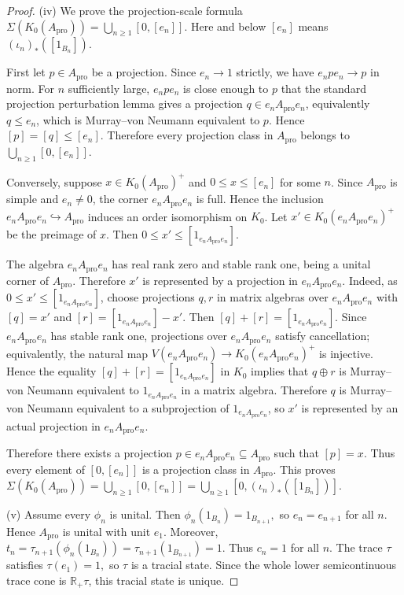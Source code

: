 \documentclass[10pt,a4paper]{amsart}
\newcommand{\R}{\mathbb{R}}
\newcommand{\ex}{\mathrm{pro}}
\begin{document}
\begin{proof}
\smallskip

\noindent
\textup{(iv)}
We prove the projection-scale formula $\Sigma(K_0(A_{\ex}))=\bigcup_{n\geq1}[0,[e_n]].$
Here and below $[e_n]$ means $(\iota_n)_*([1_{B_n}])$.

First let $p\in A_{\ex}$ be a projection. Since $e_n\to 1$ strictly, we have $e_npe_n\to p$ in norm. For $n$
sufficiently large, $e_npe_n$ is close enough to $p$ that the standard
projection perturbation lemma gives a projection $q\in e_nA_{\ex}e_n$, equivalently
$q\leq e_n$, which is Murray--von Neumann equivalent to $p$. Hence
$
[p]=[q]\leq [e_n].$
Therefore every projection class in $A_{\ex}$ belongs to
$
\bigcup_{n\geq1}[0,[e_n]].$

Conversely, suppose $x\in K_0(A_{\ex})^+$ and
$0\leq x\leq [e_n]$ for some $n$. Since $A_{\ex}$ is simple and $e_n\neq0$, the corner $e_nA_{\ex}e_n$
is full. Hence the inclusion $e_nA_{\ex}e_n\hookrightarrow A_{\ex}$
induces an order isomorphism on $K_0$. Let $x'\in K_0(e_nA_{\ex}e_n)^+$ be the
preimage of $x$. Then $0\leq x'\leq [1_{e_nA_{\ex}e_n}].$

The algebra $e_nA_{\ex}e_n$ has real rank zero and stable rank one, being a unital
corner of $A_{\ex}$. Therefore $x'$ is represented by a projection
in $e_nA_{\ex}e_n$.
Indeed, as $0\leq x'\leq [1_{e_nA_{\ex}e_n}]$, choose projections $q,r$ in matrix
algebras over $e_nA_{\ex}e_n$ with $[q]=x'$ and 
$[r]=[1_{e_nA_{\ex}e_n}]-x'.$
Then $[q]+[r]=[1_{e_nA_{\ex}e_n}].$ Since $e_nA_{\ex}e_n$ has stable rank one, projections over
$e_nA_{\ex}e_n$ satisfy cancellation; equivalently, the natural map $V(e_nA_{\ex}e_n)\to K_0(e_nA_{\ex}e_n)^+$
is injective. Hence the equality $[q]+[r]=[1_{e_nA_{\ex}e_n}]$
in $K_0$ implies that $q\oplus r$ is Murray--von Neumann equivalent to
$1_{e_nA_{\ex}e_n}$ in a matrix algebra. Therefore $q$ is Murray--von
Neumann equivalent to a subprojection of $1_{e_nA_{\ex}e_n}$, so $x'$ is
represented by an actual projection in $e_nA_{\ex}e_n$.

Therefore there exists a projection $p\in e_nA_{\ex}e_n\subseteq A_{\ex}$
such that
$[p]=x.$ Thus every element of $[0,[e_n]]$ is a projection class in $A_{\ex}$. This proves
$
\Sigma(K_0(A_{\ex}))
=\bigcup_{n\geq1}[0,[e_n]]
=\bigcup_{n\geq1}[0,(\iota_n)_*([1_{B_n}])].$

\smallskip

\noindent
\textup{(v)}
Assume every $\phi_n$ is unital. Then
$\phi_n(1_{B_n})=1_{B_{n+1}},$
so $e_n=e_{n+1}$
for all $n$. Hence $A_{\ex}$ is unital with unit $e_1$. Moreover, $t_n
=\tau_{n+1}(\phi_n(1_{B_n}))
=\tau_{n+1}(1_{B_{n+1}})=1.$
Thus $c_n=1$ for all $n$. The trace $\tau$ satisfies
$\tau(e_1)=1,$
so $\tau$ is a tracial state. Since the whole lower semicontinuous trace cone
is $\R_+\tau$, this tracial state is unique.


\end{proof}
\end{document}
